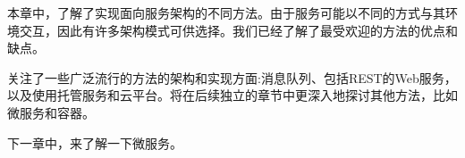 本章中，了解了实现面向服务架构的不同方法。由于服务可能以不同的方式与其环境交互，因此有许多架构模式可供选择。我们已经了解了最受欢迎的方法的优点和缺点。

关注了一些广泛流行的方法的架构和实现方面:消息队列、包括REST的Web服务，以及使用托管服务和云平台。将在后续独立的章节中更深入地探讨其他方法，比如微服务和容器。

下一章中，来了解一下微服务。